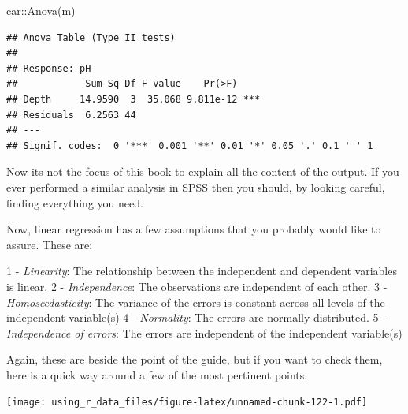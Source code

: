 \documentclass[
]{book}
\newenvironment{Shaded}{\begin{snugshade}}{\end{snugshade}}
\newcommand{\CommentTok}[1]{\textcolor[rgb]{0.56,0.35,0.01}{\textit{#1}}}
\newcommand{\DocumentationTok}[1]{\textcolor[rgb]{0.56,0.35,0.01}{\textbf{\textit{#1}}}}
\newcommand{\FunctionTok}[1]{\textcolor[rgb]{0.00,0.00,0.00}{#1}}
\newcommand{\NormalTok}[1]{#1}
\newcommand{\OtherTok}[1]{\textcolor[rgb]{0.56,0.35,0.01}{#1}}
\newcommand{\SpecialCharTok}[1]{\textcolor[rgb]{0.00,0.00,0.00}{#1}}
\begin{document}
\begin{Shaded}
\begin{Highlighting}[]
\NormalTok{car}\SpecialCharTok{::}\FunctionTok{Anova}\NormalTok{(m)}
\end{Highlighting}
\end{Shaded}

\begin{verbatim}
## Anova Table (Type II tests)
## 
## Response: pH
##            Sum Sq Df F value    Pr(>F)    
## Depth     14.9590  3  35.068 9.811e-12 ***
## Residuals  6.2563 44                      
## ---
## Signif. codes:  0 '***' 0.001 '**' 0.01 '*' 0.05 '.' 0.1 ' ' 1
\end{verbatim}

Now its not the focus of this book to explain all the content of the output. If you ever performed a similar analysis in SPSS then you should, by looking careful, finding everything you need.

Now, linear regression has a few assumptions that you probably would like to assure. These are:

1 - \emph{Linearity}: The relationship between the independent and dependent variables is linear.
2 - \emph{Independence}: The observations are independent of each other.
3 - \emph{Homoscedasticity}: The variance of the errors is constant across all levels of the independent variable(s)
4 - \emph{Normality}: The errors are normally distributed.
5 - \emph{Independence of errors}: The errors are independent of the independent variable(s)

Again, these are beside the point of the guide, but if you want to check them, here is a quick way around a few of the most pertinent points.

\begin{Shaded}
\end{Shaded}

\texttt{[image: using\_r\_data\_files/figure-latex/unnamed-chunk-122-1.pdf]}

\begin{Shaded}
\end{Shaded}
\end{document}
